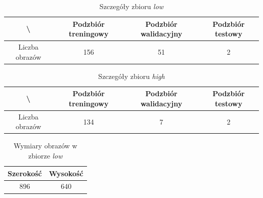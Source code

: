 \vspace{1cm}

\begin{table}[!h]
	\centering
	\caption{Szczegóły zbioru \textit{low}}
	\vspace{6pt}
	{\footnotesize
		\begin{tabular}{|c|c|c|c|}
			\hline \textbackslash & Podzbiór treningowy & Podzbiór walidacyjny & Podzbiór testowy \\
      \hline Liczba obrazów & 156 & 51 & 2 \\
      \hline
		\end{tabular}
	}
	\vspace{0pt}
\end{table}

\vspace{1cm}

\begin{table}[!h]
	\centering
	\caption{Szczegóły zbioru \textit{high}}
	\vspace{6pt}
	{\footnotesize
		\begin{tabular}{|c|c|c|c|}
			\hline \textbackslash & Podzbiór treningowy & Podzbiór walidacyjny & Podzbiór testowy \\
      \hline Liczba obrazów & 134 & 7 & 2 \\
      \hline
		\end{tabular}
	}
	\vspace{0pt}
\end{table}

\begin{table}[!h]
	\centering
	\caption{Wymiary obrazów w zbiorze \textit{low}}
	\vspace{6pt}
	{\footnotesize
		\begin{tabular}{|c|c|}
			\hline Szerokość & Wysokość \\
      \hline 896 & 640 \\
      \hline
		\end{tabular}
	}
	\vspace{0pt}
\end{table}

